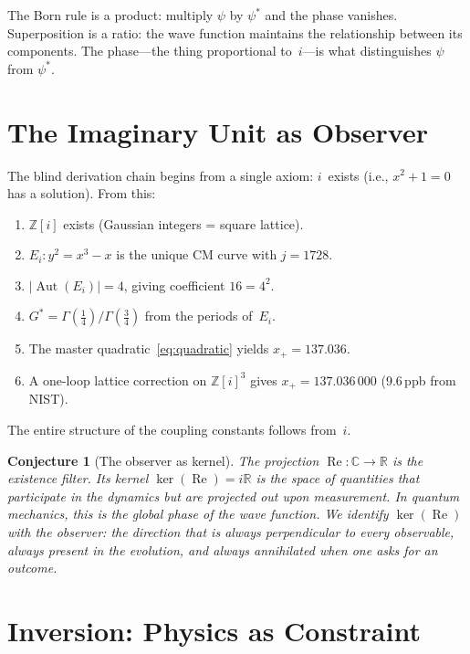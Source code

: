 \documentclass[12pt,reqno]{amsart}
\newtheorem{conjecture}[theorem]{Conjecture}
\theoremstyle{definition}
\theoremstyle{remark}
\newcommand{\ZZ}{\mathbb{Z}}
\newcommand{\RR}{\mathbb{R}}
\newcommand{\CC}{\mathbb{C}}
\newcommand{\Gstar}{G^{\!*}}
\newcommand{\abs}[1]{\lvert #1 \rvert}
\newcommand{\Aut}{\operatorname{Aut}}
\newcommand{\re}{\operatorname{Re}}
\begin{document}
The Born rule is a product: multiply $\psi$ by $\psi^*$ and the phase vanishes.
Superposition is a ratio: the wave function maintains the relationship between its
components. The phase---the thing proportional to~$i$---is what distinguishes
$\psi$ from $\psi^*$.

\section{The Imaginary Unit as Observer}

The blind derivation chain \cite{cpaci-tani2026b} begins from a single axiom:
$i$~exists (i.e., $x^2+1=0$ has a solution). From this:
\begin{enumerate}[nosep]
  \item $\ZZ[i]$ exists (Gaussian integers = square lattice).
  \item $E_i\colon y^2=x^3-x$ is the unique CM curve with $j=1728$.
  \item $\abs{\Aut(E_i)}=4$, giving coefficient $16=4^2$.
  \item $\Gstar=\Gamma(\tfrac14)/\Gamma(\tfrac34)$ from the periods of~$E_i$.
  \item The master quadratic~\eqref{eq:quadratic} yields $x_+=137.036$.
  \item A one-loop lattice correction on $\ZZ[i]^3$ gives $x_+=137.036\,000$
        (9.6\,ppb from NIST).
\end{enumerate}
The entire structure of the coupling constants follows from~$i$.

\begin{conjecture}[The observer as kernel]\label{conj:observer}
The projection $\re\colon\CC\to\RR$ is the existence filter. Its kernel
$\ker(\re)=i\RR$ is the space of quantities that participate in the dynamics
but are projected out upon measurement. In quantum mechanics, this is the
global phase of the wave function. We identify $\ker(\re)$ with the observer:
the direction that is always perpendicular to every observable, always present
in the evolution, and always annihilated when one asks for an outcome.
\end{conjecture}

\section{Inversion: Physics as Constraint}
\end{document}
